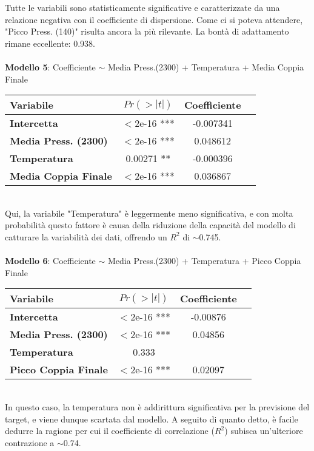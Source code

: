 \documentclass[fleqn,10pt]{SelfArx} %
\begin{document}
Tutte le variabili sono statisticamente significative e caratterizzate da una relazione negativa con il coefficiente di dispersione. Come ci si poteva attendere, "Picco Press. (140)" risulta ancora la più rilevante. La bontà di adattamento rimane eccellente: 0.938.\\
\\
\textbf{Modello 5}:  Coefficiente $\sim$ Media Press.(2300) + Temperatura + Media Coppia Finale
{\begin{table}[h] 
\centering
\begin{tabular}[t]{lccc}
\toprule 
Variabile&$Pr(> |t|)$&Coefficiente\\
\midrule 
\textbf{Intercetta}&$<$2e-16 ***&-0.007341\\ 
\textbf{Media Press. (2300)}&$<$2e-16 ***&0.048612\\
\textbf{Temperatura}&0.00271 **&-0.000396\\
\textbf{Media Coppia Finale}&$<$2e-16 ***&0.036867\\
\bottomrule 
\end{tabular}
\end{table}}\\
Qui, la variabile "Temperatura" è leggermente meno significativa, e con molta probabilità questo fattore è causa della riduzione della capacità del modello di catturare la variabilità dei dati, offrendo un $R^2$ di $\sim$0.745.\\
\\
\textbf{Modello 6}: Coefficiente $\sim$ Media Press.(2300) + Temperatura + Picco Coppia Finale
{\begin{table}[H] 
\centering
\begin{tabular}[t]{lccc}
\toprule 
Variabile&$Pr(> |t|)$&Coefficiente\\
\midrule 
\textbf{Intercetta}&$<$2e-16 ***&-0.00876\\ 
\textbf{Media Press. (2300)}&$<$2e-16 ***&0.04856\\
\textbf{Temperatura}&0.333\\
\textbf{Picco Coppia Finale}&$<$2e-16 ***&0.02097\\
\bottomrule 
\end{tabular}
\end{table}}\\
In questo caso, la temperatura non è addirittura significativa per la previsione del target, e viene dunque scartata dal modello. A seguito di quanto detto, è facile dedurre la ragione per cui il coefficiente di correlazione ($R^2$) subisca un'ulteriore contrazione a $\sim$0.74.\\
\end{document}
